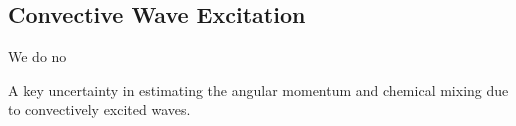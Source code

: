 {\color{purple}
\subsection{Convective Wave Excitation}
}

We do no

A key uncertainty in estimating the angular momentum and chemical mixing due to convectively excited waves.
